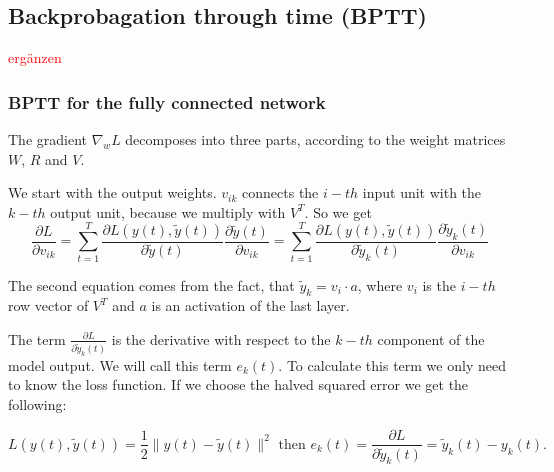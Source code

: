 \documentclass[10pt,a4paper]{article}
\numberwithin{equation}{section}
\begin{document}
\subsection{Backprobagation through time (BPTT)}
\textcolor{red}{ergänzen}

\subsubsection{BPTT for the fully connected network}
The gradient $\nabla_w L$ decomposes into three parts, according to the weight matrices $W$, $R$ and $V$.

We start with the output weights. $v_{ik}$ connects the $i-th$ input unit with the $k-th$ output unit, because we multiply with $V^T$. So we get
\begin{equation}
\frac{\partial L}{\partial v_{ik}} 
= \sum_{t=1}^T \frac{\partial L(y(t),\tilde{y}(t))}{\partial \tilde{y}(t)} \frac{\partial \tilde{y}(t)}{\partial v_{ik}} 
= \sum_{t=1}^T \frac{\partial L(y(t),\tilde{y}(t))}{\partial \tilde{y}_k(t)} \frac{\partial \tilde{y}_k(t)}{\partial v_{ik}} 
\end{equation}

The second equation comes from the fact, that $\tilde{y}_k = v_i \cdot a$, where $v_i$ is the $i-th$ row vector of $V^T$ and $a$ is an activation of the last layer.

The term $\frac{\partial L}{\partial \tilde{y}_k(t)} $ is the derivative with respect to the $k-th$ component of the model output. We will call this term $e_k(t)$. To calculate this term we only need to know the loss function. If we choose the halved squared error we get the following:


\begin{equation}
L(y(t),\tilde{y}(t)) = \frac{1}{2} \|y(t) - \tilde{y}(t) \|^2 \text{   then   } 
e_k(t) = \frac{\partial L}{\partial \tilde{y}_k(t)} = \tilde{y}_k(t) - y_k(t).
\end{equation}
\end{document}
